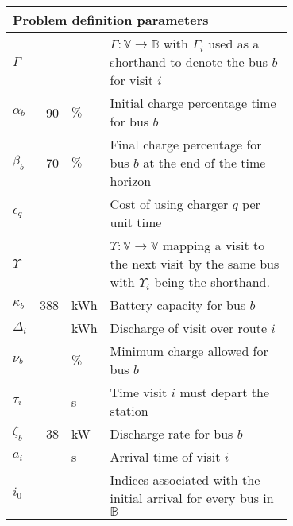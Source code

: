 \documentclass[utf8]{FrontiersinHarvard}
\newcommand{\EDIT}[1]{{\color{blue}#1}}                                         %
\begin{document}
\begin{table}[!htpb]
\begin{tabularx}{\textwidth}{l r l p{0.7\linewidth}}
    \hline \multicolumn{4}{l}{Problem definition parameters}                                                                                     \\
    \hline $\Gamma$       & &       & $\Gamma: \mathbb{V} \rightarrow \mathbb{B}$ with $\Gamma_i$ used as a shorthand to denote the bus $b$ for visit $i$                 \\
    $\alpha_b$            & \EDIT{90} & $\%$  & Initial charge percentage time for bus $b$                                                            \\
    $\beta_b$            & \EDIT{70} & $\%$  & Final charge percentage for bus $b$ at the end of the time horizon                                    \\
    $\epsilon_q$            & &       & Cost of using charger $q$ per unit time                                                                         \\
    $\Upsilon$              & &       & $\Upsilon: \mathbb{V} \rightarrow \mathbb{V}$ mapping a visit to the next visit by the same bus with $\Upsilon_i$ being the shorthand.  \\
    $\kappa_b$            & \EDIT{388} & kWh   & Battery capacity for bus $b$                                                                         \\
    $\Delta_i$            & & kWh   & Discharge of visit over route $i$                                                                               \\
    $\nu_b$            & & $\%$  & Minimum charge allowed for bus $b$                                                                              \\
    $\tau_i$            & & s     & Time visit $i$ must depart the station                                                                          \\
    $\zeta_b$            & \EDIT{38} & kW    & Discharge rate for bus $b$                                                                            \\
    $a_i$            & & s     & Arrival time of visit $i$                                                                                       \\
    $i_0$            & &       & Indices associated with the initial arrival
    for every bus in $\mathbb{B}$                                                                                                                \\

\end{tabularx}
\end{table}
\end{document}
